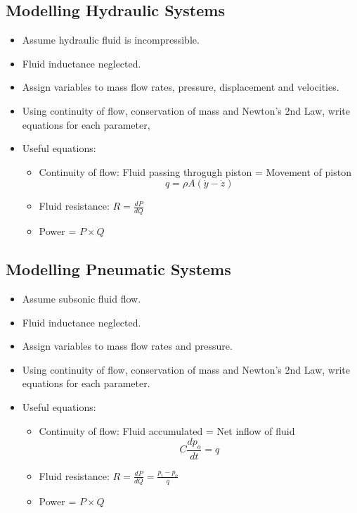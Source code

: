\documentclass[a4paper]{article}
\begin{document}
\subsection{Modelling Hydraulic Systems}
\begin{itemize}
    \item Assume hydraulic fluid is incompressible.
    \item Fluid inductance neglected.
    \item Assign variables to mass flow rates, pressure, displacement and velocities.
    \item Using continuity of flow, conservation of mass and Newton's 2nd Law, write equations for each parameter,
    \item Useful equations:
    \begin{itemize}[label=$\circ$]
        \item Continuity of flow: Fluid passing throgugh piston = Movement of piston
        $$q = \rho A(\dot{y}-\dot{z})$$
        \item Fluid resistance: $R = \displaystyle\frac{dP}{dQ}$
        \item Power = $P\times Q$
    \end{itemize}
\end{itemize}

\subsection{Modelling Pneumatic Systems}
\begin{itemize}
    \item Assume subsonic fluid flow.
    \item Fluid inductance neglected.
    \item Assign variables to mass flow rates and pressure.
    \item Using continuity of flow, conservation of mass and Newton's 2nd Law, write equations for each parameter.
    \item Useful equations:
    \begin{itemize}[label=$\circ$]
        \item Continuity of flow: Fluid accumulated = Net inflow of fluid
        $$C\frac{dp_o}{dt} = q$$
        \item Fluid resistance: $\displaystyle R = \frac{dP}{dQ} = \frac{p_i-p_o}{q}$
        \item Power = $P\times Q$
    \end{itemize}
\end{itemize}
\end{document}
